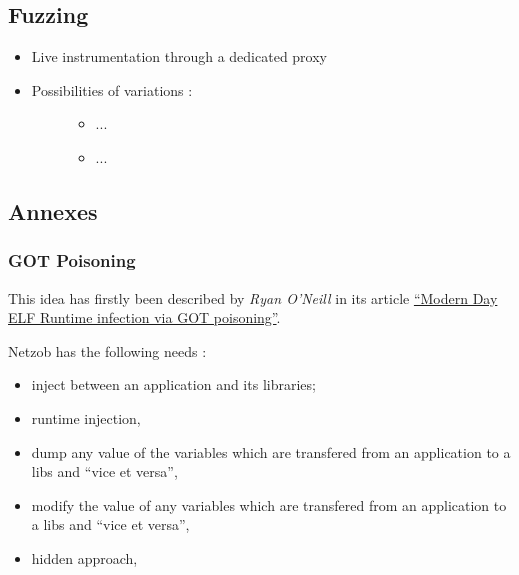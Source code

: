 \documentclass[letterpaper,10pt,english]{sphinxmanual}
\begin{document}
\subsection{Fuzzing}
\label{fuzzing/index::doc}\label{fuzzing/index:fuzzing}\label{fuzzing/index:id1}\begin{itemize}
\item {} 
Live instrumentation through a dedicated proxy

\item {} \begin{description}
\item[{Possibilities of variations :}] \leavevmode\begin{itemize}
\item {} 
...

\item {} 
...

\end{itemize}

\end{description}

\end{itemize}


\subsection{Annexes}
\label{Annexes/index::doc}\label{Annexes/index:annexes}\label{Annexes/index:id1}

\subsubsection{GOT Poisoning}
\label{Annexes/index:got-poisoning}
This idea has firstly been described by \emph{Ryan O'Neill} in its article \href{http://vx.netlux.org/lib/vrn00.html}{``Modern Day ELF Runtime infection via GOT poisoning''}.

Netzob has the following needs :
\begin{itemize}
\item {} 
inject between an application and its libraries;

\item {} 
runtime injection,

\item {} 
dump any value of the variables which are transfered from an application to a libs and ``vice et versa'',

\item {} 
modify the value of any variables which are transfered from an application to a libs and ``vice et versa'',

\item {} 
hidden approach,

\end{itemize}
\end{document}
